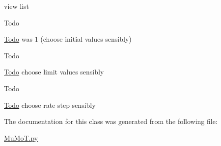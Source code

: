 view list 

\begin{DoxyRefDesc}{Todo}
\item[\hyperlink{todo__todo000024}{Todo}]was 1 (choose initial values sensibly) \end{DoxyRefDesc}
\begin{DoxyRefDesc}{Todo}
\item[\hyperlink{todo__todo000025}{Todo}]choose limit values sensibly \end{DoxyRefDesc}
\begin{DoxyRefDesc}{Todo}
\item[\hyperlink{todo__todo000026}{Todo}]choose rate step sensibly \end{DoxyRefDesc}


The documentation for this class was generated from the following file\+:\begin{DoxyCompactItemize}
\item 
\hyperlink{_mu_mo_t_8py}{Mu\+Mo\+T.\+py}\end{DoxyCompactItemize}

